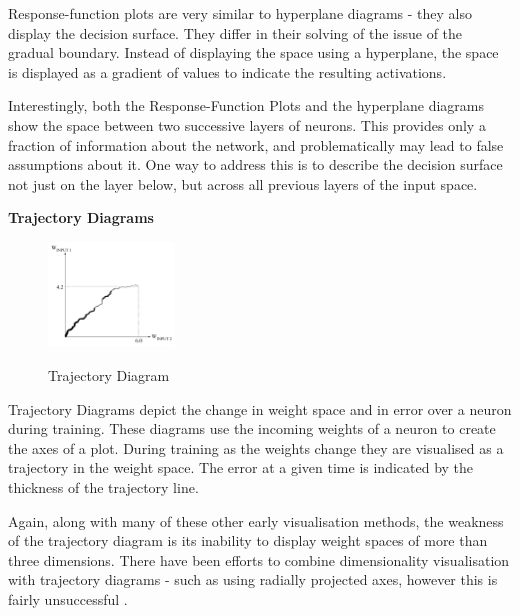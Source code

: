 \documentclass[a4paper,11pt,titlepage]{article}
\begin{document}
		Response-function plots are very similar to hyperplane diagrams - they also display the decision surface. They differ in their solving of the issue of the gradual boundary. Instead of displaying the space using a hyperplane, the space is displayed as a gradient of values to indicate the resulting activations.
		\par 
		Interestingly, both the Response-Function Plots and the hyperplane diagrams show the space between two successive layers of neurons. This provides only a fraction of information about the network, and problematically may lead to false assumptions about it. One way to address this is to describe the decision surface not just on the layer below, but across all previous layers of the input space.
		\par 
		
\textbf{Trajectory Diagrams}
		
 	\begin{figure}[H]
    			\centering	
			{{\includegraphics[width=0.3\textwidth]
    				{img/craven_trajectory.png} 
    			}}%
    			\caption{Trajectory Diagram}%
    		\label{fig:bond}
	\end{figure} 
 		
		Trajectory Diagrams \cite{Wejchert1990} depict the change in weight space and in error over a neuron during training. These diagrams use the incoming weights of a neuron to create the axes of a plot. During training as the weights change they are visualised as a trajectory in the weight space. The error at a given time is indicated by the thickness of the trajectory line.
		\par 	
		Again, along with many of these other early visualisation methods, the weakness of the trajectory diagram is its inability to display weight spaces of more than three dimensions. There have been efforts to combine dimensionality visualisation with trajectory diagrams - such as using radially projected axes, however this is fairly unsuccessful \cite{Craven1992}. 
		\par 
		
\end{document}
